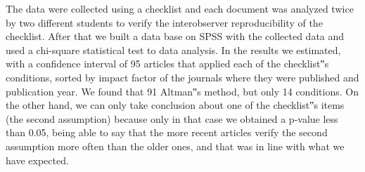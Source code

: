 \documentclass[MAIN.tex]{subfiles}
\begin{document}
The data were collected
using a checklist and each document was analyzed twice by two different students to verify the interobserver
reproducibility of the checklist. After that we built a data base on SPSS with the collected
data and used a chi-square statistical test to data analysis. In the results we estimated, with a
confidence interval of 95%
articles that applied each of the checklist‟s conditions, sorted by impact factor of the journals where
they were published and publication year. We found that 91%
Altman‟s method, but only 14%
conditions. On the other hand, we can only take conclusion about one of the checklist‟s items (the
second assumption) because only in that case we obtained a p-value less than 0.05, being able to
say that the more recent articles verify the second assumption more often than the older ones, and
that was in line with what we have expected.
\end{document}
